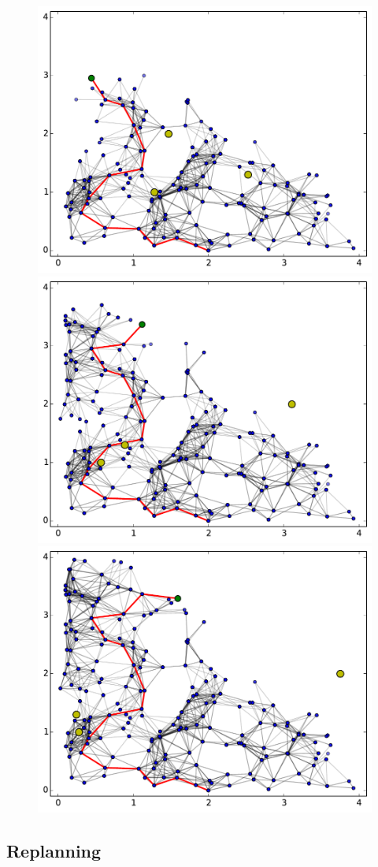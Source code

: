 \begin{figure}[h!]
    \includegraphics[width=0.32\linewidth]{figs/tree_12}
    \includegraphics[width=0.32\linewidth]{figs/tree_14}
    \includegraphics[width=0.32\linewidth]{figs/tree_15}
    \caption{}
    \label{fig:tree}
\end{figure}

\subsection{Replanning}

